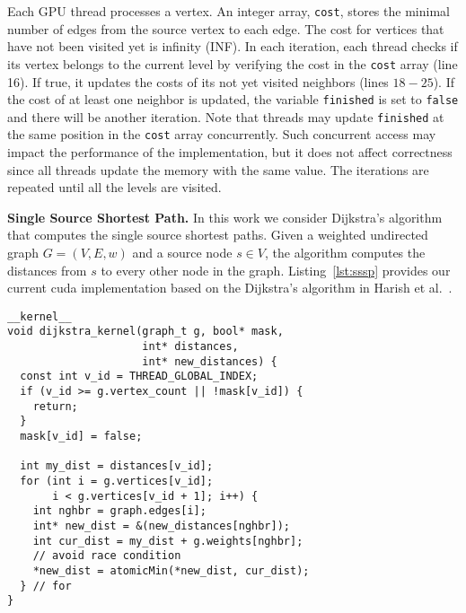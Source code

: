 Each GPU thread processes a vertex. An integer array, \texttt{cost}, stores the minimal number of edges from the source vertex to each edge. The cost for vertices that have not been visited yet is infinity (INF). In each iteration, each thread checks if its vertex belongs to the current level by verifying the cost in the \texttt{cost} array (line 16). If true, it updates the costs of its not yet visited neighbors (lines $18-25$). If the cost of at least one neighbor is updated, the variable \texttt{finished} is set to \texttt{false} and there will be another iteration. Note that threads may update \texttt{finished} at the same position in the \texttt{cost} array concurrently. Such concurrent access may impact the performance of the implementation, but it does not affect correctness since all threads update the memory with the same value. The iterations are repeated until all the levels are visited.

{\bf Single Source Shortest Path.} In this work we consider Dijkstra's algorithm that computes the single source shortest paths. Given a weighted undirected graph $G = (V, E, w)$ and a source node $s \in V$, the algorithm computes the distances from $s$ to every other node in the graph. Listing~\ref{lst:sssp} provides our current {\sc cuda} implementation based on the Dijkstra's algorithm in Harish et al.~\cite{Harish2007}.


\begin{lstlisting}[caption=GPU implementation of Single Source Shortest Path algorithm,label=lst:sssp]
__kernel__
void dijkstra_kernel(graph_t g, bool* mask, 
                     int* distances, 
                     int* new_distances) {
  const int v_id = THREAD_GLOBAL_INDEX;
  if (v_id >= g.vertex_count || !mask[v_id]) {
    return;
  }
  mask[v_id] = false;

  int my_dist = distances[v_id];
  for (int i = g.vertices[v_id]; 
       i < g.vertices[v_id + 1]; i++) {
    int nghbr = graph.edges[i];
    int* new_dist = &(new_distances[nghbr]);
    int cur_dist = my_dist + g.weights[nghbr];
    // avoid race condition
    *new_dist = atomicMin(*new_dist, cur_dist);
  } // for
}
\end{lstlisting}

